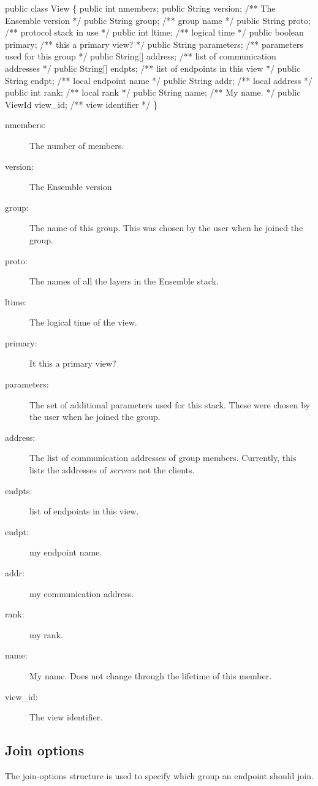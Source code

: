 \begin{codebox}
public class View \{
    public int nmembers;
    public String version;     /** The Ensemble version */
    public String group;       /** group name  */
    public String proto;       /** protocol stack in use  */
    public int ltime;          /** logical time  */
    public boolean primary;    /** this a primary view?  */
    public String parameters;  /** parameters used for this group  */
    public String[] address;   /** list of communication addresses  */
    public String[] endpts;    /** list of endpoints in this view  */
    public String endpt;       /** local endpoint name  */
    public String addr;        /** local address  */
    public int rank;           /** local rank  */
    public String name;        /** My name. */
    public ViewId view_id;     /** view identifier */
\}
\end{codebox}

\begin{description}
\item[nmembers:] The number of members. 
\item[version:] The Ensemble version
\item[group:] The name of this group. This was chosen by the user when
  he joined the group. 
\item[proto:] The names of all the layers in the Ensemble stack. 
\item[ltime:] The logical time of the view.
\item[primary:] It this a primary view? 
\item[parameters:]  The set of additional parameters used for this
  stack. These were chosen by the user when he joined the group. 
\item[address:] The list of communication addresses of group
  members. Currently, this lists the addresses of {\it servers} not
  the clients. 
\item[endpts:] list of endpoints in this view.
\item[endpt:] my endpoint name.
\item[addr:] my communication address.
\item[rank:] my rank.
\item[name:] My name. Does not change through the lifetime of this member. 
\item[view\_id:] The view identifier.
\end{description}

\subsection{Join options}
The join-options structure is used to specify which group an endpoint
should join. 

